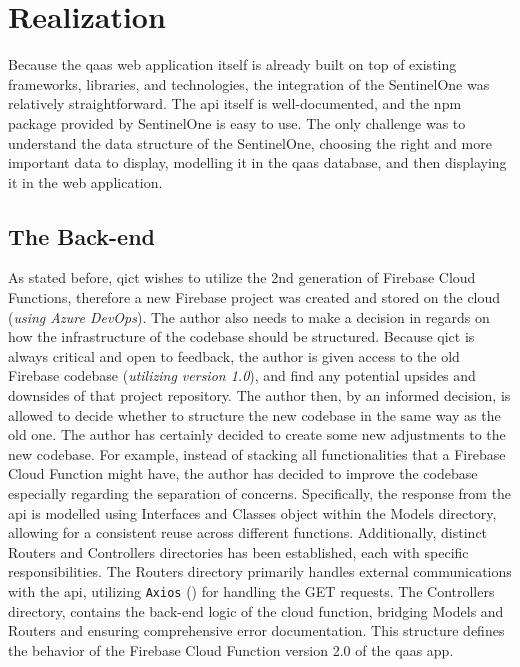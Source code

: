 \chapter{Realization}

\begin{multicols}{2}
  Because the \acrshort{qaas} web application itself is already built on top of existing frameworks, libraries, and technologies, the integration of the SentinelOne
  was relatively straightforward. The \acrshort{api} itself is well-documented, and the \acrshort{npm} package provided by SentinelOne is easy to use. The only challenge
  was to understand the data structure of the SentinelOne, choosing the right and more important data to display, modelling it in the \acrshort{qaas} database, and then
  displaying it in the web application.

  \section{The Back-end}

  As stated before, \acrshort{qict} wishes to utilize the 2nd generation of Firebase Cloud Functions, therefore a new Firebase project was created and stored on the cloud
  (\textit{using Azure DevOps}). The author also needs to make a decision in regards on how the infrastructure of the codebase should be structured. Because \acrshort{qict}
  is always critical and open to feedback, the author is given access to the old Firebase codebase (\textit{utilizing version 1.0}), and find any potential upsides and
  downsides of that project repository. The author then, by an informed decision, is allowed to decide whether to structure the new codebase in the same way as the old one.
  The author has certainly decided to create some new adjustments to the new codebase. For example, instead of stacking all functionalities that a Firebase Cloud Function
  might have, the author has decided to improve the codebase especially regarding the separation of concerns. Specifically, the response from the \acrshort{api} is
  modelled using Interfaces and Classes object within the Models directory, allowing for a consistent reuse across different functions. Additionally, distinct Routers and Controllers
  directories has been established, each with specific responsibilities. The Routers directory primarily handles external communications with the \acrshort{api},
  utilizing \texttt{Axios} (\textit{\cite{axiosNpm}}) for handling the GET requests. The Controllers directory, contains the back-end logic of the cloud function,
  bridging Models and Routers and ensuring comprehensive error documentation. This structure defines the behavior of the Firebase Cloud Function version 2.0 of the
  \acrshort{qaas} app.


\end{multicols}
